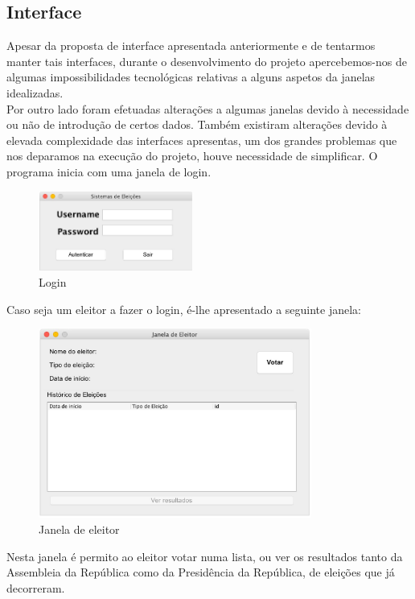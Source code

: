 \documentclass[a4paper,12pt]{report}
\begin{document}
\subsection{Interface}
Apesar da proposta de interface apresentada anteriormente e de tentarmos manter tais interfaces, durante o desenvolvimento do projeto apercebemos-nos de algumas impossibilidades tecnológicas relativas a alguns aspetos da janelas idealizadas. 
\\\indent Por outro lado foram efetuadas alterações a algumas janelas devido à necessidade ou não de introdução de certos dados. Também existiram alterações devido à elevada complexidade das interfaces apresentas, um dos grandes problemas que nos deparamos na execução do projeto, houve necessidade de simplificar.
O programa inicia com uma janela de login.
\begin{figure}[H]
\begin{center}
	\includegraphics[width=0.45\textwidth]{media/img_interface/img2.jpg}
	 \caption{Login}
\end{center}
\end{figure}
Caso seja um eleitor a fazer o login, é-lhe apresentado a seguinte janela:
\begin{figure}[H]
\begin{center}
	\includegraphics[width=0.8\textwidth]{media/img_interface/img10.jpg}
	 \caption{Janela de eleitor}
\end{center}
\end{figure}
Nesta janela é permito ao eleitor votar numa lista, ou ver os resultados tanto da Assembleia da República como da Presidência da República, de eleições que já decorreram.
\end{document}
